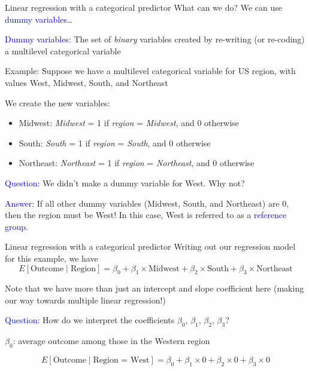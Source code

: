 \documentclass[10pt,t]{beamer}
\begin{document}
\begin{frame}{Linear regression with a categorical predictor}
What can we do? We can use \textcolor{blue}{dummy variables}\dots

\vspace{0.3cm}

\textcolor{blue}{Dummy variables}: The set of \textit{binary} variables created by re-writing (or re-coding) a multilevel categorical variable  

\vspace{0.3cm}

Example: Suppose we have a multilevel categorical variable for US region, with values West, Midwest, South, and Northeast

\vspace{0.3cm}

We create the new variables:
\begin{itemize}
	\item Midwest: \textit{Midwest} = 1 if \textit{region} = \textit{Midwest}, and 0 otherwise
	\item South: \textit{South} = 1 if \textit{region} = \textit{South}, and 0 otherwise
	\item Northeast: \textit{Northeast} = 1 if \textit{region} = \textit{Northeast}, and 0 otherwise
\end{itemize} \pause

\vspace{0.1cm}

\textcolor{blue}{Question:} We didn't make a dummy variable for West. Why not? \pause

\medskip

\textcolor{blue}{Answer:} If all other dummy variables (Midwest, South, and Northeast) are 0, then the region must be West! In this case, West is referred to as a \textcolor{blue}{reference group}.
\end{frame} 

\begin{frame}{Linear regression with a categorical predictor}
Writing out our regression model for this example, we have
$$
E[\text{Outcome} \mid \text{Region}] = \beta_0 + \beta_1 \times \text{Midwest} + \beta_2 \times \text{South} + \beta_3 \times \text{Northeast}
$$

Note that we have more than just an intercept and slope coefficient here (making our way towards multiple linear regression!)

\vspace{0.3cm}

\textcolor{blue}{Question}: How do we interpret the coefficients $\beta_0$, $\beta_1$, $\beta_2$, $\beta_3$? \pause

\vspace{0.3cm}

$\beta_0$: average outcome among those in the Western region

$$
E[\text{Outcome} \mid \text{Region = West}] = \beta_0 + \beta_1 \times 0 + \beta_2 \times 0 + \beta_3 \times 0
$$


\end{frame}
\end{document}

